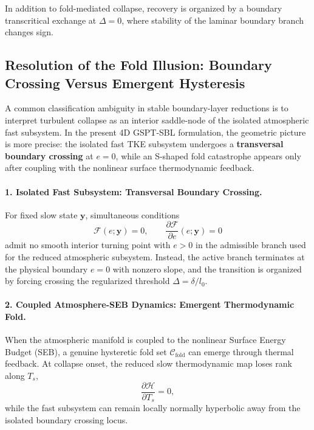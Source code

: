 \documentclass[11pt,letterpaper]{article}
\begin{document}
In addition to fold-mediated collapse, recovery is organized by a boundary transcritical exchange at $\Delta=0$, where stability of the laminar boundary branch changes sign.

\subsection{Resolution of the Fold Illusion: Boundary Crossing Versus Emergent Hysteresis}
\label{subsec:fold_illusion_resolution}

A common classification ambiguity in stable boundary-layer reductions is to interpret turbulent collapse as an interior saddle-node of the isolated atmospheric fast subsystem. In the present 4D GSPT-SBL formulation, the geometric picture is more precise: the isolated fast TKE subsystem undergoes a \textbf{transversal boundary crossing} at $e=0$, while an S-shaped fold catastrophe appears only after coupling with the nonlinear surface thermodynamic feedback.

\paragraph{1. Isolated Fast Subsystem: Transversal Boundary Crossing.}
For fixed slow state $\mathbf{y}$, simultaneous conditions
\begin{equation}
\mathcal{F}(e;\mathbf{y})=0,
\qquad
\frac{\partial \mathcal{F}}{\partial e}(e;\mathbf{y})=0
\end{equation}
admit no smooth interior turning point with $e>0$ in the admissible branch used for the reduced atmospheric subsystem. Instead, the active branch terminates at the physical boundary $e=0$ with nonzero slope, and the transition is organized by forcing crossing the regularized threshold $\Delta=\delta/l_0$.

\paragraph{2. Coupled Atmosphere-SEB Dynamics: Emergent Thermodynamic Fold.}
When the atmospheric manifold is coupled to the nonlinear Surface Energy Budget (SEB), a genuine hysteretic fold set $\mathcal{C}_{\mathrm{fold}}$ can emerge through thermal feedback. At collapse onset, the reduced slow thermodynamic map loses rank along $T_s$,
\begin{equation}
\frac{\partial \mathcal{H}}{\partial T_s}=0,
\label{eq:seb_rank_loss}
\end{equation}
while the fast subsystem can remain locally normally hyperbolic away from the isolated boundary crossing locus.
\end{document}
